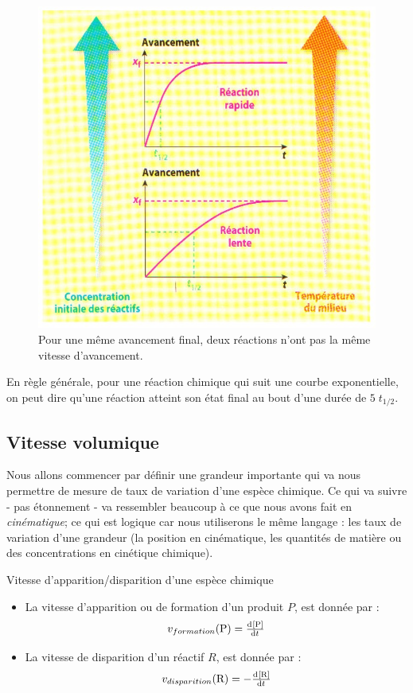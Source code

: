 \documentclass[11pt,a4paper]{article}
\begin{document}
\begin{figure}[h]
    \centering
    \includegraphics[width=0.7\linewidth]{imgs/c4/vitelente.jpg}
    \caption{Pour une même avancement final, deux réactions n'ont pas la même vitesse d'avancement. }
\end{figure}

\begin{rmrq}
En règle générale, pour une réaction chimique qui suit une courbe exponentielle, on peut dire qu'une réaction atteint son état final au bout d'une durée de $5\;t_{1/2} $.
\end{rmrq}
\subsection{Vitesse volumique}

Nous allons commencer par définir une grandeur importante qui va nous permettre de mesure de taux de variation d'une espèce chimique. Ce qui va suivre - pas étonnement - va ressembler beaucoup à ce que nous avons fait en \textit{cinématique}; ce qui est logique car nous utiliserons le même langage : les taux de variation d'une grandeur (la position en cinématique, les quantités de matière ou des concentrations en cinétique chimique). 

\begin{defn}{Vitesse d'apparition/disparition d'une espèce chimique}
\begin{itemize}
    \item La vitesse d'apparition ou de formation d'un produit $P$, est donnée par : 
    \[ v_{formation}(\ce{P}) = \od{\left[\ce{P}\right]}{t}       \]
    \item La vitesse de disparition d'un réactif $R$, est donnée par : 
    \[ v_{disparition}(\ce{R}) = - \od{\left[\ce{R}\right]}{t}       \]
\end{itemize}
\end{defn}
\end{document}
